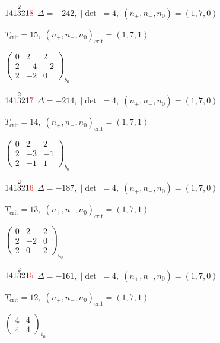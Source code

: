 \documentclass[10pt]{article}
\begin{document}
$141\overset{2}{3}21\textcolor{red}{8}$ \quad $\Delta=-242,\; |\det|=4,\; (n_+,n_-,n_0)=(1,7,0)$

\hspace{1em}$T_{\text{crit}}=15,\; (n_+,n_-,n_0)_{\text{crit}}=(1,7,1)$

\hspace{2em}$\left(\begin{smallmatrix}0 & 2 & 2 \\ 2 & -4 & -2 \\ 2 & -2 & 0\end{smallmatrix}\right)_{\!b_0}$

$141\overset{2}{3}21\textcolor{red}{7}$ \quad $\Delta=-214,\; |\det|=4,\; (n_+,n_-,n_0)=(1,7,0)$

\hspace{1em}$T_{\text{crit}}=14,\; (n_+,n_-,n_0)_{\text{crit}}=(1,7,1)$

\hspace{2em}$\left(\begin{smallmatrix}0 & 2 & 2 \\ 2 & -3 & -1 \\ 2 & -1 & 1\end{smallmatrix}\right)_{\!b_0}$

$141\overset{2}{3}21\textcolor{red}{6}$ \quad $\Delta=-187,\; |\det|=4,\; (n_+,n_-,n_0)=(1,7,0)$

\hspace{1em}$T_{\text{crit}}=13,\; (n_+,n_-,n_0)_{\text{crit}}=(1,7,1)$

\hspace{2em}$\left(\begin{smallmatrix}0 & 2 & 2 \\ 2 & -2 & 0 \\ 2 & 0 & 2\end{smallmatrix}\right)_{\!b_0}$

$141\overset{2}{3}21\textcolor{red}{5}$ \quad $\Delta=-161,\; |\det|=4,\; (n_+,n_-,n_0)=(1,7,0)$

\hspace{1em}$T_{\text{crit}}=12,\; (n_+,n_-,n_0)_{\text{crit}}=(1,7,1)$

\hspace{2em}$\left(\begin{smallmatrix}4 & 4 \\ 4 & 4\end{smallmatrix}\right)_{\!b_0}$

\smallskip
\end{document}
